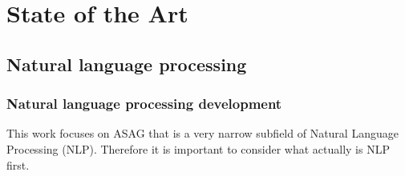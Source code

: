 
\chapter{State of the Art}

\section{\textbf{Natural language processing}}

\subsection{Natural language processing development}

This work focuses on ASAG that is a very narrow subfield of Natural Language Processing (NLP). Therefore it is important to consider what actually is NLP first.\\

